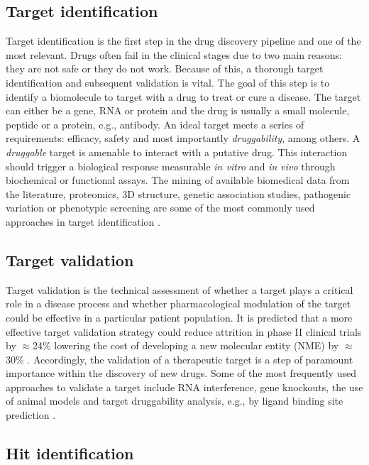 \subsection{Target identification}

Target identification is the first step in the drug discovery pipeline and one of the most relevant. Drugs often fail in the clinical stages due to two main reasons: they are not safe or they do not work. Because of this, a thorough target identification and subsequent validation is vital. The goal of this step is to identify a biomolecule to target with a drug to treat or cure a disease. The target can either be a gene, RNA or protein and the drug is usually a small molecule, peptide or a protein, e.g., antibody. An ideal target meets a series of requirements: efficacy, safety and most importantly \textit{druggability}, among others. A \textit{druggable} target is amenable to interact with a putative drug. This interaction should trigger a biological response measurable \textit{in vitro} and \textit{in vivo} through biochemical or functional assays. The mining of available biomedical data from the literature, proteomics, 3D structure, genetic association studies, pathogenic variation or phenotypic screening are some of the most commonly used approaches in target identification \cite{SCHENONE_2013_TARGETID}.

\subsection{Target validation}

Target validation is the technical assessment of whether a target plays a critical role in a disease process and whether pharmacological modulation of the target could be effective in a particular patient population. It is predicted that a more effective target validation strategy could reduce attrition in phase II clinical trials by $\approx$24\% lowering the cost of developing a new molecular entity (NME) by $\approx$30\% \cite{PAUL_2010_RD}. Accordingly, the validation of a therapeutic target is a step of paramount importance within the discovery of new drugs. Some of the most frequently used approaches to validate a target include RNA interference, gene knockouts, the use of animal models and target druggability analysis, e.g., by ligand binding site prediction \cite{EMMERICH_2021_TARGET_VAL}.

\subsection{Hit identification}

